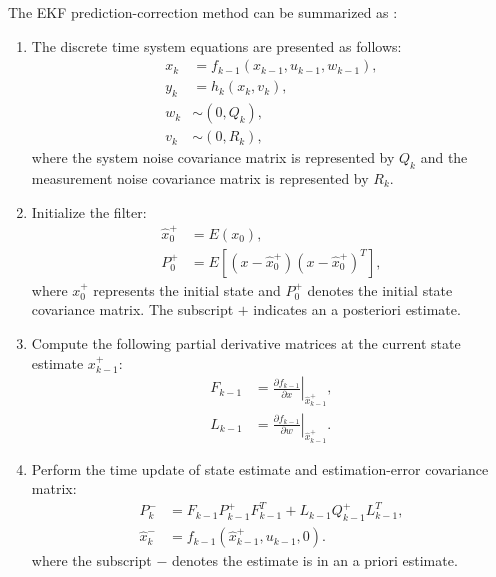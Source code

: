 The EKF prediction-correction method can be summarized as \autocite{Simon_2006}:
\begin{enumerate}
    \item The discrete time system equations are presented as follows:
    \begin{equation}
    \begin{aligned}
        x_{k} & =f_{k-1}\left(x_{k-1}, u_{k-1}, w_{k-1}\right), \\
        y_{k} & =h_{k}\left(x_{k}, v_{k}\right), \\
        w_{k} & \sim\left(0, Q_{k}\right), \\
        v_{k} & \sim\left(0, R_{k}\right),
    \end{aligned}
    \end{equation}  
where the system noise covariance matrix is represented by $Q_k$ and the measurement noise covariance matrix is represented by $R_k$.
    \item Initialize the filter:
    \begin{equation}
        \begin{aligned}
        \hat{x}_{0}^{+} & =E\left(x_{0}\right), \\
        P_{0}^{+} & =E\left[\left(x-\hat{x}_{0}^{+}\right)\left(x-\hat{x}_{0}^{+}\right)^{T}\right],
        \end{aligned}
    \end{equation}
    where ${x}_{0}^{+}$ represents the initial state and $P_{0}^{+}$ denotes the initial state covariance  matrix. The subscript $+$ indicates an a posteriori estimate.
    

    \item Compute the following partial derivative matrices at the current state estimate ${x}_{k-1}^{+}$:
        \begin{equation}
        \begin{aligned}
            F_{k-1} & =\left.\frac{\partial f_{k-1}}{\partial x}\right|_{\hat{x}_{k-1}^{+}}, \\
            L_{k-1} & =\left.\frac{\partial f_{k-1}}{\partial w}\right|_{\hat{x}_{k-1}^{+}}.
        \end{aligned}
        \end{equation}
    
    \item Perform the time update of state estimate and estimation-error covariance matrix:
        \begin{equation}
        \begin{aligned}
            P_{k}^{-} & =F_{k-1} P_{k-1}^{+} F_{k-1}^{T}+L_{k-1} Q_{k-1}^{+} L_{k-1}^{T}, \\
            \hat{x}_{k}^{-} & =f_{k-1}\left(\hat{x}_{k-1}^{+}, u_{k-1}, 0\right).
        \end{aligned}
        \end{equation}
    where the subscript $-$ denotes the estimate is in an a priori estimate.
    

\end{enumerate}
